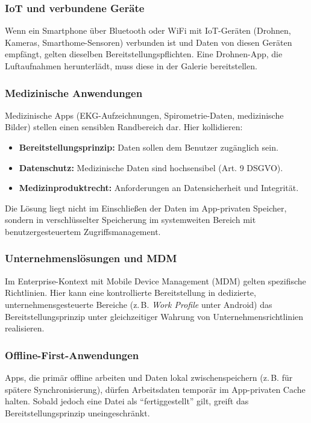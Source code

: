 ﻿\documentclass[12pt, a4paper]{article}
\begin{document}
\subsubsection{IoT und verbundene Geräte}

Wenn ein Smartphone über Bluetooth oder WiFi mit IoT-Geräten (Drohnen, Kameras,
Smarthome-Sensoren) verbunden ist und Daten von diesen Geräten empfängt, gelten
dieselben Bereitstellungspflichten. Eine Drohnen-App, die Luftaufnahmen herunterlädt,
muss diese in der Galerie bereitstellen.

\subsubsection{Medizinische Anwendungen}

Medizinische Apps (EKG-Aufzeichnungen, Spirometrie-Daten, medizinische Bilder)
stellen einen sensiblen Randbereich dar. Hier kollidieren:
\begin{itemize}[leftmargin=*]
  \item \textbf{Bereitstellungsprinzip:} Daten sollen dem Benutzer zugänglich sein.
  \item \textbf{Datenschutz:} Medizinische Daten sind hochsensibel (Art. 9 DSGVO).
  \item \textbf{Medizinproduktrecht:} Anforderungen an Datensicherheit und Integrität.
\end{itemize}

Die Lösung liegt nicht im Einschließen der Daten im App-privaten Speicher, sondern
in verschlüsselter Speicherung im systemweiten Bereich mit benutzergesteuertem
Zugriffsmanagement.

\subsubsection{Unternehmenslösungen und MDM}

Im Enterprise-Kontext mit Mobile Device Management (MDM) gelten spezifische
Richtlinien. Hier kann eine kontrollierte Bereitstellung in dedizierte,
unternehmensgesteuerte Bereiche (z.\,B. \emph{Work Profile} unter Android)
das Bereitstellungsprinzip unter gleichzeitiger Wahrung von Unternehmensrichtlinien
realisieren.

\subsubsection{Offline-First-Anwendungen}

Apps, die primär offline arbeiten und Daten lokal zwischenspeichern (z.\,B. für
spätere Synchronisierung), dürfen Arbeitsdaten temporär im App-privaten Cache
halten. Sobald jedoch eine Datei als \enquote{fertiggestellt} gilt, greift das
Bereitstellungsprinzip uneingeschränkt.
\end{document}
